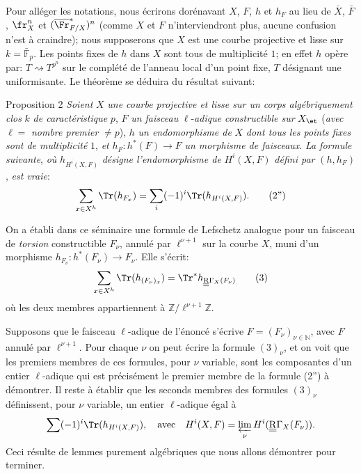 Pour alléger les notations, nous écrirons dorénavant $X$, $F$, $h$ et $h_F$ au lieu de $\bar X$, $\bar F$, $\fr_X^n$ et $(\overline{\Fr}^*_{F/X})^n$ (comme $X$ et $F$ n'interviendront plus, aucune confusion n'est à craindre); nous supposerons que $X$ est une courbe projective et lisse sur $k=\bar{\mathbb{F}}_p$. Les points fixes de $h$ dans $X$ sont tous de multiplicité $1$; en effet $h$ opère par: $T\rightsquigarrow T^{p^n}$ sur le complété de l'anneau local d'un point fixe, $T$ désignant une uniformisante. Le théorème se déduira du résultat suivant:

\begin{statement}{Proposition 2}
\emph{Soient} $X$ \emph{une courbe projective et lisse sur un corps algébriquement clos} $k$ \emph{de caractéristique} $p$, $F$ \emph{un faisceau}
$\ell$-\emph{adique constructible sur} $X_{\et}$ (\emph{avec} $\ell=$ \emph{nombre premier} $\ne p$), $h$ \emph{un endomorphisme de} $X$ \emph{dont tous les points fixes sont de multiplicité} $1$, \emph{et} $h_F:h^*(F)\to F$ \emph{un morphisme de faisceaux}. \emph{La formule suivante}, \emph{où} $h_{H^i(X,F)}$ \emph{désigne l'endomorphisme de} $H^i(X,F)$ \emph{défini par} $(h,h_F)$, \emph{est vraie}:
\[
\sum_{x\in X^h}\Tr(h_{F_x})=\sum_i(-1)^i\Tr(h_{H^i(X,F)}).
\tag{2''}
\]
\end{statement}

On a établi dans ce séminaire une formule de Lefschetz analogue pour un faisceau de \emph{torsion} constructible $F_\nu$, annulé par $\ell^{\nu+1}$ sur la courbe $X$, muni d'un morphisme $h_{F_\nu}:h^*(F_\nu)\to F_\nu$. Elle s'écrit:
\[
\sum_{x\in X^h}\Tr(h_{(F_\nu)_x})=\Tr^*h_{\underline{\underline{\mathrm{R}}}\Gamma_X(F_\nu)}
\tag{3}
\]
où les deux membres appartiennent à $\mathbb{Z}/\ell^{\nu+1}\mathbb{Z}$.

Supposons que le faisceau $\ell$-adique de l'énoncé s'écrive $F=(F_\nu)_{\nu\in\mathbb{N}}$, avec $F$ annulé par $\ell^{\nu+1}$. Pour chaque $\nu$ on peut écrire la formule $(3)_\nu$, et on voit que les premiers membres de ces formules, pour $\nu$ variable, sont les composantes d'un entier $\ell$-adique qui est précisément le premier membre de la formule (2'') à démontrer. Il reste à établir que les seconds membres des formules $(3)_\nu$ définissent, pour $\nu$ variable, un entier $\ell$-adique égal à
\[
\sum(-1)^i\Tr(h_{H^i(X,F)}),
\quad\text{avec}\quad
H^i(X,F)=\varprojlim_\nu H^i(\underline{\underline{\mathrm{R}}}\Gamma_X(F_\nu)).
\]
Ceci résulte de lemmes purement algébriques que nous allons démontrer pour terminer.

